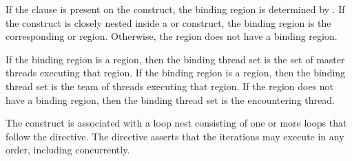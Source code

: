 
%

\binding

If the  clause is present on the construct, the binding region is
determined by . If the  construct is closely
nested inside a  or  construct, the binding region
is the corresponding  or  region. Otherwise, the
 region does not have a binding region.

If the binding region is a  region, then the binding thread set is
the set of master threads executing that region. If the binding region is a
 region, then the binding thread set is the team of threads
executing that region. If the  region does not have a binding
region, then the binding thread set is the encountering thread.



\descr

The  construct is associated with a loop nest consisting of one or
more loops that follow the directive. The directive asserts that the iterations
may execute in any order, including concurrently.

